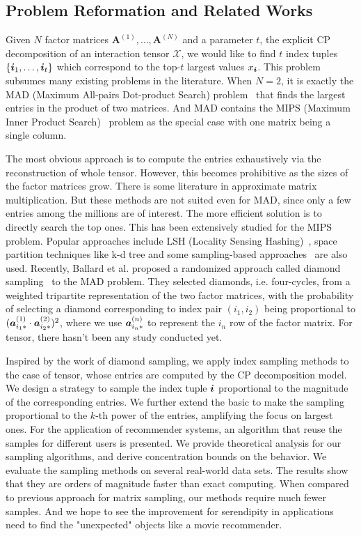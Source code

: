 \documentclass[10pt,journal,compsoc]{IEEEtran}
\newcommand{\T}[1]{\mathcal{#1}}
\newcommand{\V}[1]{{\boldsymbol{{\MakeLowercase{#1}}}}}
\newcommand{\RowVecA}[1]{\V{a}^{(#1)}_{i_#1*}}
\begin{document}
\subsection{Problem Reformation and Related Works}

Given $N$ factor matrices $\textbf{A}^{(1)},\ldots,\textbf{A}^{(N)}$ and a parameter $t$,
the explicit CP decomposition of an interaction tensor $\T{X}$, we would like to find $t$ index tuples $\{\V{i}_1,\ldots,\V{i}_t\}$ which correspond to the top-$t$ largest values $x_{\V{i}}$. This problem subsumes many existing problems in the literature.
When $N=2$, it is exactly the MAD (Maximum All-pairs Dot-product Search) problem~\cite{BaPiKoSe15}
that finds the largest entries in the product of two matrices.
And MAD contains the MIPS (Maximum Inner Product Search)~\cite{Cohen97} problem
as the special case with one matrix being a single column.

The most obvious approach is to compute the entries exhaustively via the reconstruction of whole tensor.
However, this becomes prohibitive as the sizes of the factor matrices grow.
There is some literature in approximate matrix multiplication.
But these methods are not suited even for MAD,
since only a few entries among the millions are of interest.
The more efficient solution is to directly search the top ones.
This has been extensively studied for the MIPS problem.
Popular approaches include LSH (Locality Sensing Hashing)~\cite{Andoni08,ALSH14},
space partition techniques like k-d tree
and some sampling-based approaches~\cite{Drineas2006,John15} are also used.
Recently, Ballard et al. proposed a randomized approach called diamond sampling~\cite{BaPiKoSe15} to the MAD problem.
They selected diamonds, i.e. four-cycles, from a weighted tripartite representation of the two factor matrices,
with the probability of selecting a diamond corresponding to index pair $(i_1,i_2)$
being proportional to $(\RowVecA{1}\cdot\RowVecA{2})^2$,
where we use $\RowVecA{n}$ to represent the $i_n$ row of the factor matrix.
For tensor, there hasn't been any study conducted yet.

Inspired by the work of diamond sampling,
we apply index sampling methods to the case of tensor,
whose entries are computed by the CP decomposition model.
We design a strategy to sample the index tuple $\V{i}$ proportional to the magnitude of the corresponding entries.
We further extend the basic to make the sampling proportional to the $k$-th power of the entries, amplifying the focus on largest ones.
For the application of recommender systems,
an algorithm that reuse the samples for different users is presented.
We provide theoretical analysis for our sampling algorithms,
and derive concentration bounds on the behavior.
We evaluate the sampling methods on several real-world data sets.
The results show that they are orders of magnitude faster than exact computing.
When compared to previous approach for matrix sampling, our methods require much fewer samples.
And we hope to see the improvement for serendipity in applications need to find the "unexpected" objects like a movie recommender.
\end{document}
